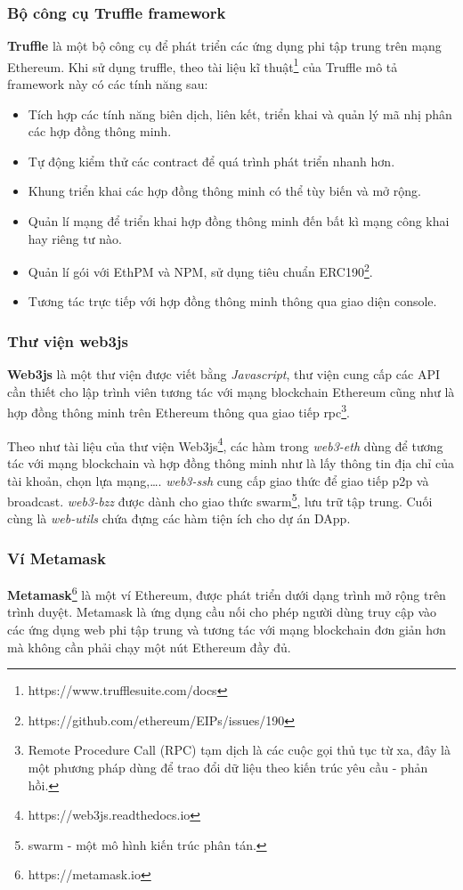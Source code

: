 \documentclass[../main-report.tex]{subfiles}
\begin{document}
\subsubsection{Bộ công cụ Truffle framework}
\textbf{Truffle} là một bộ công cụ để phát triển các ứng dụng phi tập trung trên mạng Ethereum. Khi sử dụng truffle, theo tài liệu kĩ thuật\footnote{https://www.trufflesuite.com/docs} của Truffle mô tả framework này có các tính năng sau:

\begin{itemize}
\item Tích hợp các tính năng biên dịch, liên kết, triển khai và quản lý mã nhị phân các hợp đồng thông minh.
\item Tự động kiểm thử các contract để quá trình phát triển nhanh hơn.
\item Khung triển khai các hợp đồng thông minh có thể tùy biến và mở rộng.
\item Quản lí mạng để triển khai hợp đồng thông minh đến bất kì mạng công khai hay riêng tư nào.
\item Quản lí gói với EthPM và NPM, sử dụng tiêu chuẩn ERC190\footnote{https://github.com/ethereum/EIPs/issues/190}.
\item Tương tác trực tiếp với hợp đồng thông minh thông qua giao diện console.
\end{itemize}

\subsubsection{Thư viện web3js}
\textbf{Web3js} là một thư viện được viết bằng \textit{Javascript}, thư viện cung cấp các API cần thiết cho lập trình viên tương tác với mạng blockchain Ethereum cũng như là hợp đồng thông minh trên Ethereum thông qua giao tiếp \acrfull{rpc}\footnote{Remote Procedure Call (RPC) tạm dịch là các cuộc gọi thủ tục từ xa, đây là một phương pháp dùng để trao đổi dữ liệu theo kiến trúc yêu cầu - phản hồi.}.

Theo như tài liệu của thư viện Web3js\footnote{https://web3js.readthedocs.io}, các hàm trong \textit{web3-eth} dùng để tương tác với mạng blockchain và hợp đồng thông minh như là lấy thông tin địa chỉ của tài khoản, chọn lựa mạng,\ldots. \textit{web3-ssh} cung cấp giao thức để giao tiếp \acrshort{p2p} và broadcast. \textit{web3-bzz} được dành cho giao thức swarm\footnote{swarm - một mô hình kiến trúc phân tán.}, lưu trữ tập trung. Cuối cùng là \textit{web-utils} chứa đựng các hàm tiện ích cho dự án DApp.
\subsubsection{Ví Metamask}
\textbf{Metamask}\footnote{https://metamask.io} là một ví Ethereum, được phát triển dưới dạng trình mở rộng trên trình duyệt. Metamask là ứng dụng cầu nối cho phép người dùng truy cập vào các ứng dụng web phi tập trung và tương tác với mạng blockchain đơn giản hơn mà không cần phải chạy một nút Ethereum đầy đủ.
\end{document}
